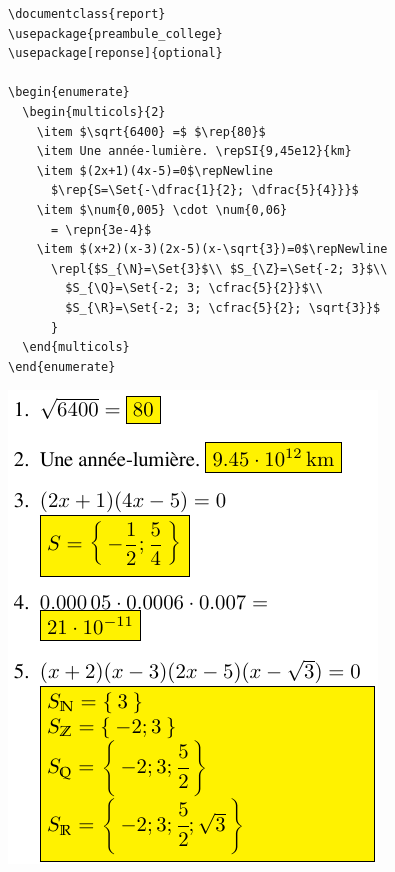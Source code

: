 \begin{minipage}{.63\linewidth}
	\begin{verbatim}
\documentclass{report}
\usepackage{preambule_college}
\usepackage[reponse]{optional}

\begin{enumerate}
  \begin{multicols}{2}
    \item $\sqrt{6400} =$ $\rep{80}$
    \item Une année-lumière. \repSI{9,45e12}{km}
    \item $(2x+1)(4x-5)=0$\repNewline
      $\rep{S=\Set{-\dfrac{1}{2}; \dfrac{5}{4}}}$
    \item $\num{0,005} \cdot \num{0,06}
      = \repn{3e-4}$
    \item $(x+2)(x-3)(2x-5)(x-\sqrt{3})=0$\repNewline
      \repl{$S_{\N}=\Set{3}$\\ $S_{\Z}=\Set{-2; 3}$\\
        $S_{\Q}=\Set{-2; 3; \cfrac{5}{2}}$\\
        $S_{\R}=\Set{-2; 3; \cfrac{5}{2}; \sqrt{3}}$
      }
  \end{multicols}
\end{enumerate}

	\end{verbatim}
\end{minipage}
\hfill
\begin{minipage}{.35\linewidth}
	\includegraphics{images/choix_extensions_exemple_reponses}
\end{minipage}




